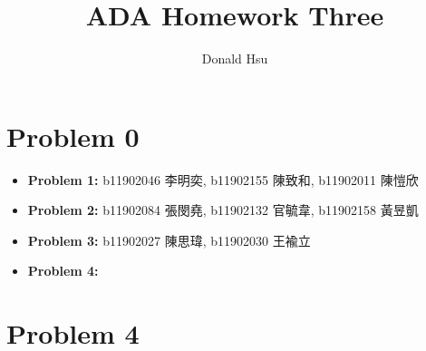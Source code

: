 \documentclass{homework}
\author{Donald Hsu}
\title{ADA Homework Three}
\begin{document}
\maketitle
\section*{Problem 0}
\begin{itemize}
    \item \textbf{Problem 1:} b11902046 李明奕, b11902155 陳致和, b11902011 陳愷欣
    \item \textbf{Problem 2:} b11902084 張閔堯, b11902132 官毓韋, b11902158 黃昱凱
    \item \textbf{Problem 3:} b11902027 陳思瑋, b11902030 王褕立
    \item \textbf{Problem 4:} 
\end{itemize}
\clearpage

\section*{Problem 4}
\end{document}
